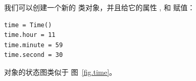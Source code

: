 我们可以创建一个新的  类对象，并且给它的属性  ,
 和  赋值：

\begin{lstlisting}
time = Time()
time.hour = 11
time.minute = 59
time.second = 30
\end{lstlisting}

%

 对象的状态图类似于 图~\ref{fig.time}。

  
  


